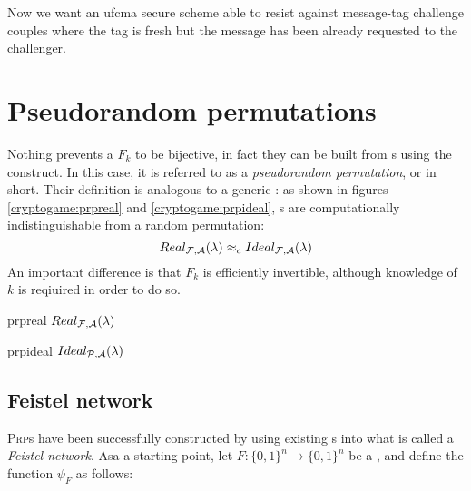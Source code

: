 Now we want an ufcma secure scheme able to resist against message-tag challenge couples where the tag is fresh but the message has been already requested to the challenger.

\section{Pseudorandom permutations}


Nothing prevents a \prf{} $F_k$ to be bijective, in fact they can be built from \owp{}s using the \ggm{} construct. In this case, it is referred to as a \emph{pseudorandom permutation}, or \prp{} in short. Their definition is analogous to a generic \prf: as shown in figures \ref{cryptogame:prpreal} and \ref{cryptogame:prpideal}, \prp{}s are computationally indistinguishable from a random permutation:
\[
    Real_{\mathcal{F}, \mathcal{A}}(\lambda) \approx_{c} Ideal_{\mathcal{F}, \mathcal{A}}(\lambda)
\]
An important difference is that $F_k$ is efficiently invertible, although knowledge of $k$ is reqiuired in order to do so.

\begin{cryptogame}
    {prpreal}
    {$Real_{\mathcal{F}, \mathcal{A}}(\lambda)$}
    {}


    \cseqbeginloop
    \cseqendloop

    
\end{cryptogame}

\begin{cryptogame}
    {prpideal}
    {$Ideal_{\mathcal{P}, \mathcal{A}}(\lambda)$}
    {}


    \cseqbeginloop
    \cseqendloop

    
\end{cryptogame}

\subsection{Feistel network}

\textsc{Prp}s have been successfully constructed by using existing \prf{}s into what is called a \emph{Feistel network}. Asa a starting point, let $F : \{0, 1\}^n \to \{0, 1\}^n$ be a \prf, and define the function $\psi_F$ as follows:

